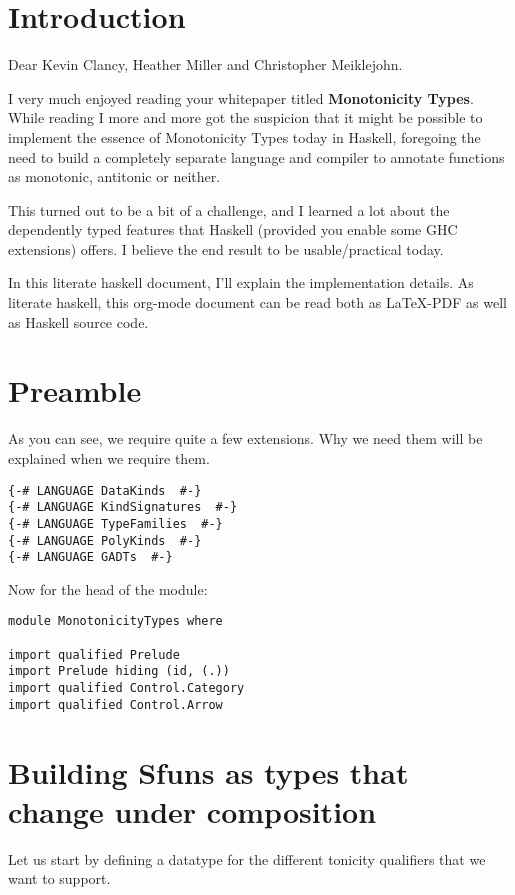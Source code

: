 \documentclass[11pt]{article}
\author{Wiebe-Marten Wijnja}
\date{\today}
\title{}
\begin{document}
\tableofcontents


\section{Introduction}
\label{sec:org2246baf}

Dear Kevin Clancy, Heather Miller and Christopher Meiklejohn.

I very much enjoyed reading your whitepaper titled \textbf{Monotonicity Types}.
While reading I more and more got the suspicion that it might be possible to implement the essence of Monotonicity Types today in Haskell,
foregoing the need to build a completely separate language and compiler to annotate functions as monotonic, antitonic or neither.

This turned out to be a bit of a challenge, and I learned a lot about the dependently typed features that Haskell (provided you enable some GHC extensions) offers.
I believe the end result to be usable/practical today.

In this literate haskell document, I'll explain the implementation details.
As literate haskell, this org-mode document can be read both as \LaTeX{}-PDF as well as Haskell source code.


\section{Preamble}
\label{sec:orge93588e}
As you can see, we require quite a few extensions. Why we need them will be explained when we require them.
\begin{verbatim}
{-# LANGUAGE DataKinds  #-}
{-# LANGUAGE KindSignatures  #-}
{-# LANGUAGE TypeFamilies  #-}
{-# LANGUAGE PolyKinds  #-}
{-# LANGUAGE GADTs  #-}

\end{verbatim}

Now for the head of the module:

\begin{verbatim}
module MonotonicityTypes where

import qualified Prelude
import Prelude hiding (id, (.))
import qualified Control.Category
import qualified Control.Arrow
\end{verbatim}

\section{Building Sfuns as types that change under composition}
\label{sec:orgf41ff6d}
Let us start by defining a datatype for the different tonicity qualifiers that we want to support.
\end{document}
